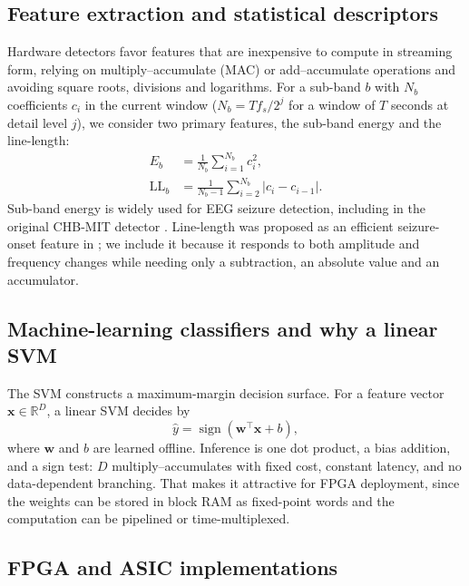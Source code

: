 \documentclass[10pt,twocolumn,letterpaper]{article}
\begin{document}
\subsection{Feature extraction and statistical descriptors}
\label{sec:features}

Hardware detectors favor features that are inexpensive to compute in
streaming form, relying on multiply--accumulate (MAC) or add--accumulate
operations and avoiding square roots, divisions and logarithms. For a
sub-band $b$ with $N_b$ coefficients $c_i$ in the current window
($N_b = T f_s/2^{j}$ for a window of $T$ seconds at detail level $j$),
we consider two primary features, the sub-band energy and the
line-length:
\begin{align}
  E_b &= \frac{1}{N_b}\sum_{i=1}^{N_b} c_i^{2}, \label{eq:energy}\\
  \mathrm{LL}_b &= \frac{1}{N_b-1}\sum_{i=2}^{N_b} \left| c_i - c_{i-1} \right|. \label{eq:ll}
\end{align}
Sub-band energy is widely used for EEG seizure detection, including in
the original CHB-MIT detector \cite{shoeb2010icml}. Line-length was proposed as an efficient seizure-onset feature in
\cite{esteller2001}; we include it because it responds to both amplitude
and frequency changes while needing only a subtraction, an absolute
value and an accumulator.

\subsection{Machine-learning classifiers and why a linear SVM}

The SVM \cite{cortes1995support} constructs a maximum-margin decision
surface. For a feature vector $\mathbf{x}\in\mathbb{R}^{D}$, a linear SVM
decides by
\begin{equation}
  \hat{y}=\operatorname{sign}\!\left(\mathbf{w}^{\top}\mathbf{x}+b\right),
\end{equation}
where $\mathbf{w}$ and $b$ are learned offline. Inference is one dot
product, a bias addition, and a sign test: $D$ multiply--accumulates
with fixed cost, constant latency, and no data-dependent branching. That
makes it attractive for FPGA deployment, since the weights can be stored
in block RAM as fixed-point words and the computation can be pipelined
or time-multiplexed.

\subsection{FPGA and ASIC implementations}
\label{sec:hw}
\end{document}
